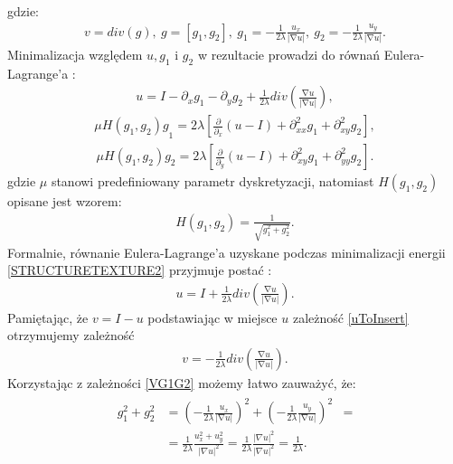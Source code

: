 \documentclass[12pt, twoside, openany]{report}
\theoremstyle{definition}
\begin{document}
gdzie:
\begin{align}
v=div(g),\ g=\left[ g_1,g_2 \right],\ g_1=-\frac{1}{2\lambda }\frac{u_x}{\left|\mathrm{\nabla }u\right|},\ g_2=-\frac{1}{2\lambda }\frac{u_y}{\left|\mathrm{\nabla }u\right|}.
\label{VG1G2}
\end{align}
Minimalizacja względem $u, g_1$ i $g_2$ w rezultacie prowadzi do równań Eulera-Lagrange'a \cite{vese2003modeling}:
\begin{align}
u=I-{\partial }_xg_1-{\partial }_yg_2+\frac{1}{2\lambda }div\left(\frac{\mathrm{\nabla }u}{\left|\mathrm{\nabla }u\right|}\right),
\label{EL1}
\end{align}
\begin{align}
{\mu H\left(g_1,g_2\right)g}_1=2\lambda \left[\frac{\partial }{{\partial }_x}\left(u-I\right)+{\partial }^2_{xx}g_1+{\partial }^2_{xy}g_2\right],
\label{EL2}
\end{align}
\begin{align}
\mu H\left(g_1,g_2\right)g_2=2\lambda \left[\frac{\partial }{{\partial }_y}\left(u-I\right)+{\partial }^2_{xy}g_1+{\partial }^2_{yy}g_2\right].
\label{EL3}
\end{align}
gdzie $\mu$ stanowi predefiniowany parametr dyskretyzacji, natomiast $H\left(g_1,g_2\right)$ opisane jest wzorem:
\begin{align}
H\left(g_1,g_2\right)=\frac{1}{\sqrt{g^2_1+g^2_2}}.
\end{align}
Formalnie, równanie Eulera-Lagrange'a uzyskane podczas minimalizacji energii \eqref{STRUCTURETEXTURE2} przyjmuje postać \cite{vese2003modeling}:
\begin{align}
u=I+\frac{1}{2\lambda }div\left(\frac{\mathrm{\nabla }u}{\left|\mathrm{\nabla }u\right|}\right).
\label{uToInsert}
\end{align}
Pamiętając, że $v = I -u$ podstawiając w miejsce $u$ zależność \eqref{uToInsert} otrzymujemy zależność
\begin{align}
v=-\frac{1}{2\lambda }div\left(\frac{\mathrm{\nabla }u}{\left|\mathrm{\nabla }u\right|}\right).
\end{align}
Korzystając z zależności \eqref{VG1G2} możemy łatwo zauważyć, że:
\begin{align}
\begin{aligned}
g^2_1+g^2_2 & = 
\left(-\frac{1}{2\lambda }\frac{u_x}{\left|\mathrm{\nabla }u\right|}\right)^2 +  \left(-\frac{1}{2\lambda }\frac{u_y}{\left|\mathrm{\nabla }u\right|}\right)^2 &=\\
&= \frac{1}{2\lambda} \frac{u_x^2 + u_y^2 }{|\nabla u|^2} = \frac{1}{2\lambda} \frac{|\nabla u|^2}{|\nabla u|^2} = \frac{1}{2\lambda}.
\end{aligned}
\end{align}
\end{document}

